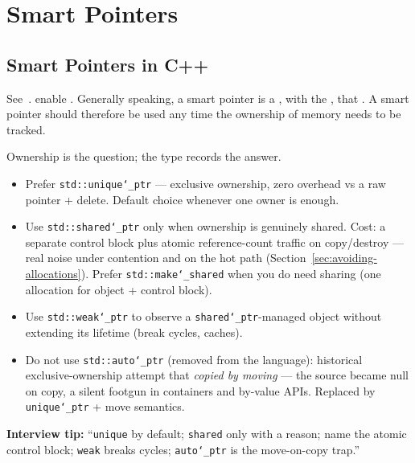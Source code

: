 \chapter{Smart Pointers}
\label{chap:smartpoint}

\section{Smart Pointers in C++}
See~\cite{cppreference-dynmemmanagement}.
\newline
{} enable .
\newline
Generally speaking, a smart pointer is a , with the , that .
\newline
A smart pointer should therefore be used any time 
the ownership of memory needs to be tracked.

Ownership is the question; the type records the answer.
\begin{itemize}
    \item Prefer \texttt{std::unique\char`_ptr} --- exclusive ownership, zero overhead vs a raw pointer + delete.
          Default choice whenever one owner is enough.
    \item Use \texttt{std::shared\char`_ptr} only when ownership is genuinely shared.
          Cost: a separate control block plus atomic reference-count traffic on 
          copy/destroy --- real noise under contention and on the hot path 
          (Section~\ref{sec:avoiding-allocations}). Prefer 
          \texttt{std::make\char`_shared} when you do need sharing (one allocation 
          for object + control block).
    \item Use \texttt{std::weak\char`_ptr} to observe a \texttt{shared\char`_ptr}-managed object 
          without extending its lifetime (break cycles, caches).
    \item Do not use \texttt{std::auto\char`_ptr} (removed from the language): 
          historical exclusive-ownership attempt that \emph{copied by moving} --- 
          the source became null on copy, a silent footgun in containers and 
          by-value APIs. Replaced by \texttt{unique\char`_ptr} + move semantics.
\end{itemize}
\par\noindent\textbf{Interview tip:} ``\texttt{unique} by default; \texttt{shared} 
only with a reason; name the atomic control block; \texttt{weak} breaks cycles; 
\texttt{auto\char`_ptr} is the move-on-copy trap.''

